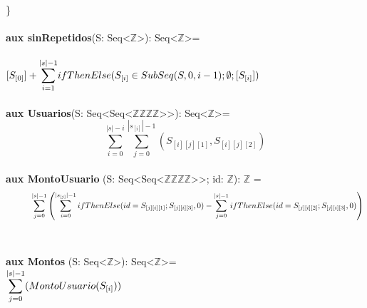 \documentclass{article}
\begin{document}
    \}\\\\

    \textbf{aux sinRepetidos}(S: Seq\textless$\mathds{Z}$\textgreater): Seq\textless$\mathds{Z}$\textgreater =\\\\
        \indent\indent $[S_{[0]}] + \mathlarger\sum\limits_{i=1}^{|s|-1} ifThenElse(S_{[i]} \in SubSeq(S, 0, i-1); \emptyset; [S_{[i]}])$ \\\\

    \textbf{aux Usuarios}(S: Seq\textless Seq\textless$\mathds{Z}$\texttimes$\mathds{Z}$\texttimes$\mathds{Z}$\texttimes$\mathds{Z}$\textgreater\textgreater): Seq\textless$\mathds{Z}$\textgreater=
    \[
    \sum\limits_{i=0}^{|s|-i} \sum\limits_{j=0}^{|s_{[i]}|-1} \left(S_{[i][j][1]}, S_{[i][j][2]}\right)
    \]\\

    \textbf{aux MontoUsuario} (S: Seq\textless Seq\textless $\mathds{Z}$\texttimes$\mathds{Z}$\texttimes$\mathds{Z}$\texttimes$\mathds{Z}$\textgreater\textgreater; id: $\mathds{Z}$): $\mathds{Z}$ =\\
        \[
        \indent\indent \sum\limits_{j=0}^{|s|-1} \left( \sum\limits_{i=0}^{|s_{[j]}|-1} 
                        ifThenElse(id = S_{[j][i][1]}; S_{[j][i][3]}, 0) 
                        - \sum\limits_{j=0}^{|s|-1} ifThenElse(id = S_{[j][i][2]}; S_{[j][i][3]}, 0) \right)
        \]\\\\

    \textbf{aux Montos} (S: Seq\textless$\mathds{Z}$\textgreater): Seq\textless$\mathds{Z}$\textgreater = \\

        \indent\indent $\mathlarger\sum\limits_{j=0}^{|s|-1} (MontoUsuario(S_{[i]}))$
\end{document}
